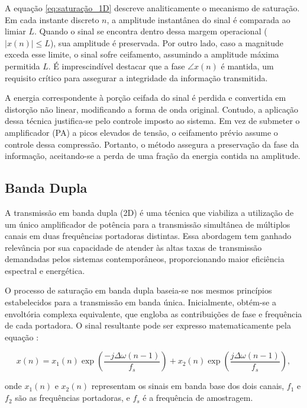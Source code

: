 A equação \ref{eq:saturação_1D} descreve analiticamente o mecanismo de saturação. Em cada instante discreto $n$, a amplitude instantânea do sinal é comparada ao limiar $L$. Quando o sinal se encontra dentro dessa margem operacional ($|x(n)| \le L$), sua amplitude é preservada. Por outro lado, caso a magnitude exceda esse limite, o sinal sofre ceifamento, assumindo a amplitude máxima permitida $L$. É imprescindível destacar que a fase $\angle x(n)$ é mantida, um requisito crítico para assegurar a integridade da informação transmitida. 

A energia correspondente à porção ceifada do sinal é perdida e convertida em distorção não linear, modificando a forma de onda original. Contudo, a aplicação dessa técnica justifica-se pelo controle imposto ao sistema. Em vez de submeter o amplificador (PA) a picos elevados de tensão, o ceifamento prévio assume o controle dessa compressão. Portanto, o método assegura a preservação da fase da informação, aceitando-se a perda de uma fração da energia contida na amplitude.

\subsection{Banda Dupla}
A transmissão em banda dupla (2D) é uma técnica que viabiliza a utilização de um único amplificador de potência para a transmissão simultânea de múltiplos canais em duas frequências portadoras distintas. Essa abordagem tem ganhado relevância por sua capacidade de atender às altas taxas de transmissão demandadas pelos sistemas contemporâneos, proporcionando maior eficiência espectral e energética.

O processo de saturação em banda dupla baseia-se nos mesmos princípios estabelecidos para a transmissão em banda única. Inicialmente, obtém-se a envoltória complexa equivalente, que engloba as contribuições de fase e frequência de cada portadora. O sinal resultante pode ser expresso matematicamente pela equação \cite{Artigo1}:

\begin{equation}
	x(n) = x_1(n) \exp\left( \frac{-j\Delta\omega(n-1)}{f_s} \right) + x_2(n) \exp\left( \frac{j\Delta\omega(n-1)}{f_s} \right),
\end{equation}

\noindent onde $x_1(n)$ e $x_2(n)$ representam os sinais em banda base dos dois canais, $f_1$ e $f_2$ são as frequências portadoras, e $f_s$ é a frequência de amostragem.

